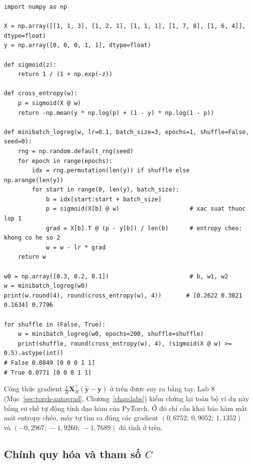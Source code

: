 
\begin{lstlisting}[caption={Mini-batch Gradient Descent cho hồi quy logistic, có và không xáo trộn}]
import numpy as np

X = np.array([[1, 1, 3], [1, 2, 1], [1, 1, 1], [1, 7, 8], [1, 6, 4]], dtype=float)
y = np.array([0, 0, 0, 1, 1], dtype=float)

def sigmoid(z):
    return 1 / (1 + np.exp(-z))

def cross_entropy(w):
    p = sigmoid(X @ w)
    return -np.mean(y * np.log(p) + (1 - y) * np.log(1 - p))

def minibatch_logreg(w, lr=0.1, batch_size=3, epochs=1, shuffle=False, seed=0):
    rng = np.random.default_rng(seed)
    for epoch in range(epochs):
        idx = rng.permutation(len(y)) if shuffle else np.arange(len(y))
        for start in range(0, len(y), batch_size):
            b = idx[start:start + batch_size]
            p = sigmoid(X[b] @ w)                    # xac suat thuoc lop 1
            grad = X[b].T @ (p - y[b]) / len(b)      # entropy cheo: khong co he so 2
            w = w - lr * grad
    return w

w0 = np.array([0.3, 0.2, 0.1])                       # b, w1, w2
w = minibatch_logreg(w0)
print(w.round(4), round(cross_entropy(w), 4))       # [0.2622 0.3021 0.1634] 0.7796

for shuffle in (False, True):
    w = minibatch_logreg(w0, epochs=200, shuffle=shuffle)
    print(shuffle, round(cross_entropy(w), 4), (sigmoid(X @ w) >= 0.5).astype(int))
# False 0.0849 [0 0 0 1 1]
# True 0.0771 [0 0 0 1 1]
\end{lstlisting}

\noindent Công thức gradient $\frac{1}{B}\mathbf{X}_B^\top(\hat{\mathbf{y}} - \mathbf{y})$ ở trên được suy ra bằng tay. Lab 8 (Mục~\ref{sec:torch-autograd}, Chương~\ref{chap:labs}) kiểm chứng lại toàn bộ ví dụ này bằng cơ chế tự động tính đạo hàm của PyTorch. Ở đó chỉ cần khai báo hàm mất mát entropy chéo, máy tự tìm ra đúng các gradient $(0{,}6752;\ 0{,}9052;\ 1{,}1352)$ và $(-0{,}2967;\ -1{,}9260;\ -1{,}7689)$ đã tính ở trên.

\subsection{Chính quy hóa và tham số $C$}

